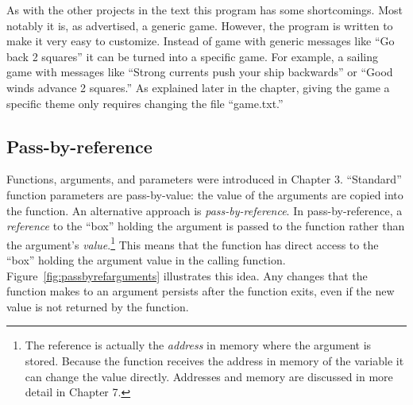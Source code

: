 As with the other projects in the text this program has some shortcomings.  Most notably it is, as advertised, a generic game.  However, the program is written to make it very easy to customize.  Instead of game with generic messages like ``Go back 2 squares'' it can be turned into a specific game. For example, a sailing game with messages like ``Strong currents push your ship backwards'' or ``Good winds advance 2 squares.''  As explained later in the chapter, giving the game a specific theme only requires changing the file ``game.txt.'' 

\subsection{Pass-by-reference}

Functions, arguments, and parameters were introduced in Chapter 3.  ``Standard'' function parameters are pass-by-value: the value of the arguments are copied into the function.  An alternative approach is \emph{pass-by-reference}.  In pass-by-reference, a \emph{reference} to the ``box'' holding the argument is passed to the function rather than the argument's \emph{value}.\footnote{The reference is actually the \emph{address} in memory where the argument is stored.  Because the function receives the address in memory of the variable it can change the value directly.  Addresses and memory are discussed in more detail in Chapter 7.} This means that the function has direct access to the ``box'' holding the argument value in the calling function.   Figure~\ref{fig:passbyrefarguments} illustrates this idea.  Any changes that the function makes to an argument persists after the function exits, even if the new value is not returned by the function.  

